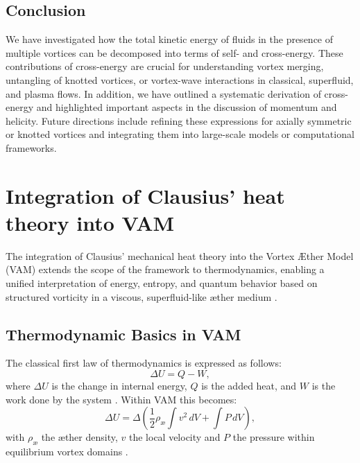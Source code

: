 \documentclass[preprint]{revtex4-2}
\begin{document}
\subsection*{Conclusion}
We have investigated how the total kinetic energy of fluids in the presence of multiple
vortices can be decomposed into terms of self- and cross-energy. These contributions of cross-energy
are crucial for understanding vortex merging, untangling of knotted vortices, or vortex-wave interactions in classical, superfluid, and plasma flows. In addition, we have outlined a systematic derivation of cross-energy and
highlighted important aspects in the discussion of momentum and helicity. Future directions
include refining these expressions for axially symmetric or knotted vortices and
integrating them into large-scale models or computational frameworks.
\section{Integration of Clausius' heat theory into VAM}\label{sec:appendix:8}

The integration of Clausius' mechanical heat theory into the Vortex Æther Model (VAM) extends the scope of the framework to thermodynamics,
enabling a unified interpretation of energy, entropy, and quantum behavior based on structured vorticity in a viscous, superfluid-like æther
medium \cite{clausius1865mechanical, maxwell1865electromagnetic, helmholtz1858integrals}.

\subsection{Thermodynamic Basics in VAM}

The classical first law of thermodynamics is expressed as follows:
\begin{equation}
    \Delta U = Q - W,\label{eq:first_law_thermodynamics}
\end{equation}
where $\Delta U$ is the change in internal energy, $Q$ is the added heat, and $W$ is the work done by the system \cite{clausius1865mechanical}. Within VAM this becomes:
\begin{equation}
    \Delta U = \Delta \left( \frac{1}{2} \rho_\text{\ae} \int v^2 \, dV + \int P \, dV \right),\label{eq:first_law_vam}
\end{equation}
with $\rho_\text{\ae}$ the æther density, $v$ the local velocity and $P$ the pressure within equilibrium vortex domains \cite{iskandarani2025swirl}.
\end{document}
